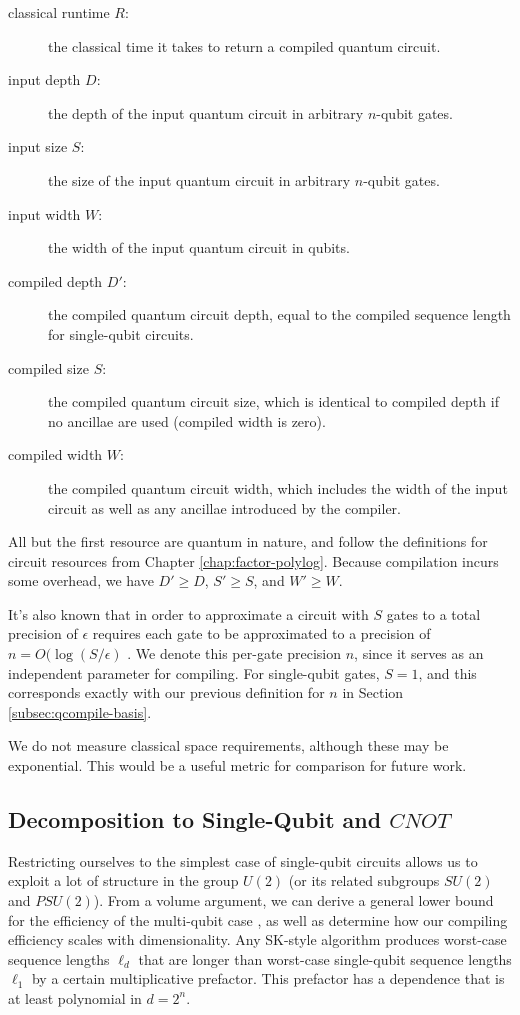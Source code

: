 \begin{description}
\item[classical runtime $R$:] the classical time it takes to return a 
compiled quantum circuit.
\item[input depth $D$:] the depth of the input quantum circuit in arbitrary
$n$-qubit gates.
\item[input size $S$:] the size of the input quantum circuit in arbitrary
$n$-qubit gates.
\item[input width $W$:] the width of the input quantum circuit in qubits.
\item[compiled depth $D'$:] the compiled quantum circuit depth, equal to
the compiled sequence length for single-qubit circuits.
\item[compiled size $S$:] the compiled quantum circuit size, which is
identical to compiled depth if no ancillae are used (compiled width is zero).
\item[compiled width $W$:] the compiled quantum circuit width, which includes
the width of the input circuit as well as any ancillae introduced by
the compiler.
\end{description}

All but the first resource are quantum in nature, and follow the definitions
for circuit resources from Chapter \ref{chap:factor-polylog}. Because
compilation incurs some overhead, we have $D' \ge D$, $S' \ge S$, and
$W' \ge W$.

It's also known that
in order to approximate a circuit with $S$ gates to a total precision of
$\epsilon$
requires each gate to be approximated to a precision of
$n = O(\log(S/\epsilon)$ \cite{Lloyd1995}. We denote this per-gate precision
$n$, since it serves as an independent parameter for compiling. For
single-qubit gates, $S = 1$, and this corresponds exactly with our previous
definition for $n$ in Section \ref{subsec:qcompile-basis}.

We do not measure classical space requirements, although these may be
exponential. This would be a useful metric for comparison for future work.

\subsection{Decomposition to Single-Qubit and $CNOT$}
\label{subsec:qcompile-multi}

Restricting ourselves to the simplest case of
single-qubit circuits allows us to exploit a lot of structure
in the group $U(2)$ (or its related subgroups $SU(2)$ and $PSU(2)$).
From a volume argument, we can derive a general
lower bound for the efficiency of the multi-qubit case \cite{Harrow2003},
as well as determine how our compiling efficiency scales with dimensionality.
Any
SK-style algorithm produces worst-case sequence lengths $\ell_d$ that
are longer than worst-case single-qubit sequence lengths $\ell_1$ by a certain multiplicative
prefactor. This prefactor has a dependence that is at least
polynomial in $d = 2^n$. 

